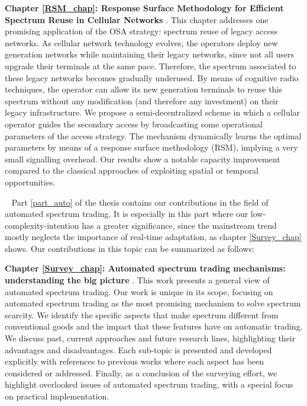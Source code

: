 \textbf{Chapter \ref{RSM_chap}: Response Surface Methodology for Efficient Spectrum Reuse in Cellular Networks} \cite{ref:Alcaraz2014_RSM,ref:Alcaraz2015_RSM}.
This chapter addresses one promising application of the OSA strategy: spectrum reuse of legacy access networks. As cellular network technology evolves, the operators deploy new generation networks while maintaining their legacy networks, since not all users upgrade their terminals at the same pace.
Therefore, the spectrum associated to these legacy networks becomes gradually underused.
By means of cognitive radio techniques, the operator can allow its new generation terminals to reuse this spectrum without any modification (and therefore any investment) on their legacy infrastructure.
We propose a semi-decentralized scheme in which a cellular operator guides the secondary access by broadcasting some operational parameters of the access strategy.
The mechanism dynamically learns the optimal parameters by means of a response surface methodology (RSM), implying a very small signalling overhead.
Our results show a notable capacity improvement compared to the classical approaches of exploiting spatial or temporal opportunities.

~\newline
Part \ref{part_auto} of the thesis contains our contributions in the field of automated spectrum trading. 
It is especially in this part where our low-complexity-intention has a greater significance, since the mainstream trend mostly neglects the importance of real-time adaptation, as chapter \ref{Survey_chap} shows. 
Our contributions in this topic can be summarized as follows:

\textbf{Chapter \ref{Survey_chap}: Automated spectrum trading mechanisms: understanding the big picture} \cite{ref:Mario2014}.
This work presents a general view of automated spectrum trading.
Our work is unique in its scope, focusing on automated spectrum trading as the most promising mechanism to solve spectrum scarcity.
We identify the specific aspects that make spectrum different from conventional goods and the impact that these features have on automatic trading.
We discuss past, current approaches and future research lines, highlighting their advantages and disadvantages. 
Each sub-topic is presented and developed explicitly with references to previous works where each aspect has been considered or addressed.
Finally, as a conclusion of the surveying effort, we highlight overlooked issues of automated spectrum trading, with a special focus on practical implementation.

